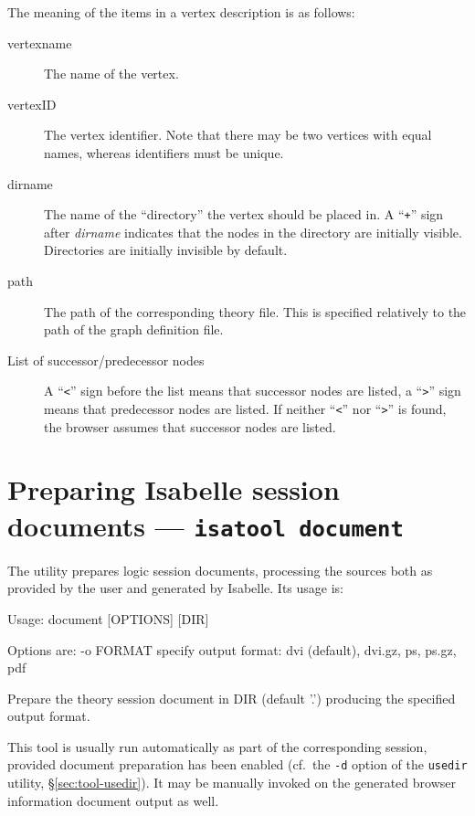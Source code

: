 The meaning of the items in a vertex description is as follows:
\begin{description}
  
\item[vertexname] The name of the vertex.
  
\item[vertexID] The vertex identifier. Note that there may be two
  vertices with equal names, whereas identifiers must be unique.
  
\item[dirname] The name of the ``directory'' the vertex should be
  placed in.  A ``{\tt +}'' sign after {\it dirname} indicates that
  the nodes in the directory are initially visible. Directories are
  initially invisible by default.
  
\item[path] The path of the corresponding theory file. This is
  specified relatively to the path of the graph definition file.
  
\item[List of successor/predecessor nodes] A ``{\tt <}'' sign before
  the list means that successor nodes are listed, a ``{\tt >}'' sign
  means that predecessor nodes are listed. If neither ``{\tt <}'' nor
  ``{\tt >}'' is found, the browser assumes that successor nodes are
  listed.

\end{description}


\section{Preparing Isabelle session documents --- \texttt{isatool document}}
\label{sec:tool-document}

The  utility prepares logic session documents, processing the
sources both as provided by the user and generated by Isabelle.  Its usage is:
\begin{ttbox}
Usage: document [OPTIONS] [DIR]

  Options are:
    -o FORMAT    specify output format: dvi (default), dvi.gz, ps,
                 ps.gz, pdf

  Prepare the theory session document in DIR (default '.')
  producing the specified output format.
\end{ttbox}
This tool is usually run automatically as part of the corresponding session,
provided document preparation has been enabled (cf.\ the \texttt{-d} option of
the \texttt{usedir} utility, \S\ref{sec:tool-usedir}).  It may be manually
invoked on the generated browser information document output as well.

